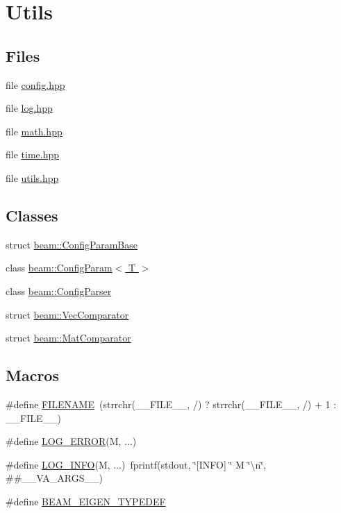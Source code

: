 \hypertarget{group__utils}{}\section{Utils}
\label{group__utils}
\subsection*{Files}
\begin{DoxyCompactItemize}
\item 
file \hyperlink{config_8hpp}{config.\+hpp}
\item 
file \hyperlink{log_8hpp}{log.\+hpp}
\item 
file \hyperlink{math_8hpp}{math.\+hpp}
\item 
file \hyperlink{time_8hpp}{time.\+hpp}
\item 
file \hyperlink{utils_8hpp}{utils.\+hpp}
\end{DoxyCompactItemize}
\subsection*{Classes}
\begin{DoxyCompactItemize}
\item 
struct \hyperlink{structbeam_1_1_config_param_base}{beam\+::\+Config\+Param\+Base}
\item 
class \hyperlink{classbeam_1_1_config_param}{beam\+::\+Config\+Param$<$ T $>$}
\item 
class \hyperlink{classbeam_1_1_config_parser}{beam\+::\+Config\+Parser}
\item 
struct \hyperlink{structbeam_1_1_vec_comparator}{beam\+::\+Vec\+Comparator}
\item 
struct \hyperlink{structbeam_1_1_mat_comparator}{beam\+::\+Mat\+Comparator}
\end{DoxyCompactItemize}
\subsection*{Macros}
\begin{DoxyCompactItemize}
\item 
\#define \hyperlink{group__utils_ga8de29f7c8bbf1a81cc6e71ac602032d3}{F\+I\+L\+E\+N\+A\+ME}~(strrchr(\+\_\+\+\_\+\+F\+I\+L\+E\+\_\+\+\_\+, \textquotesingle{}/\textquotesingle{}) ? strrchr(\+\_\+\+\_\+\+F\+I\+L\+E\+\_\+\+\_\+, \textquotesingle{}/\textquotesingle{}) + 1 \+: \+\_\+\+\_\+\+F\+I\+L\+E\+\_\+\+\_\+)
\item 
\#define \hyperlink{group__utils_ga187d17bb2372f3cc639923dba56dad1b}{L\+O\+G\+\_\+\+E\+R\+R\+OR}(M, ...)
\item 
\#define \hyperlink{group__utils_ga2ea0e9153d7e590b2b2b6c2bee498a76}{L\+O\+G\+\_\+\+I\+N\+FO}(M, ...)~fprintf(stdout, \char`\"{}\mbox{[}I\+N\+FO\mbox{]} \char`\"{} M \char`\"{}\textbackslash{}n\char`\"{}, \#\#\+\_\+\+\_\+\+V\+A\+\_\+\+A\+R\+G\+S\+\_\+\+\_\+)
\item 
\#define \hyperlink{group__utils_ga9f2375aee996fb13eecdf9eab8aceb6e}{B\+E\+A\+M\+\_\+\+E\+I\+G\+E\+N\+\_\+\+T\+Y\+P\+E\+D\+EF}
\end{DoxyCompactItemize}
